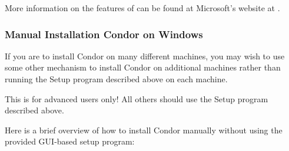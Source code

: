 More information on the features of \verb@msiexec@
can be found at Microsoft's website at
.

\subsubsection{\label{sec:NT-Manual-Install}Manual Installation Condor on Windows}

If you are to install Condor on many different machines, you may wish
to use some other mechanism to install Condor on additional machines
rather than running the Setup program described above on each machine.

\Warn This is for advanced users only!  All others should use the Setup program described above. 

Here is a brief overview of how to install Condor manually without using the provided GUI-based setup program:

